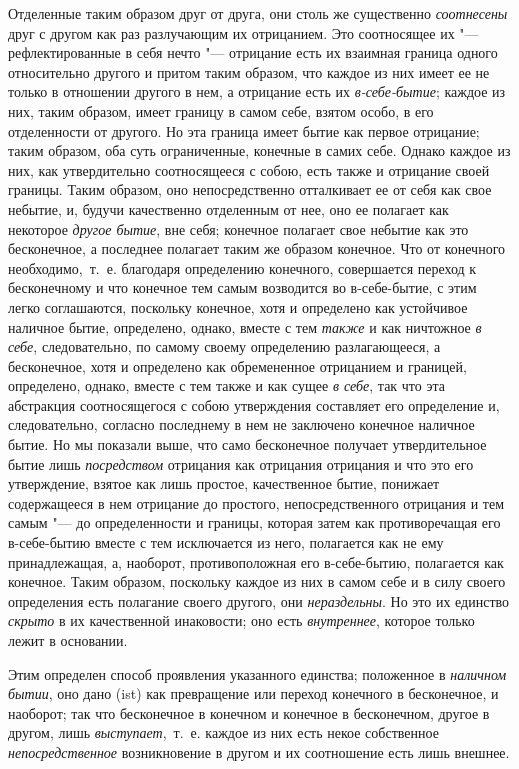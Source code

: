 Отделенные таким образом друг от друга, они столь же существенно
{\em соотнесены} друг с другом как раз разлучающим их
отрицанием. Это соотносящее их "--- рефлектированные в себя нечто "--- отрицание
есть их взаимная граница одного относительно другого и притом таким
образом, что каждое из них имеет ее не только в отношении другого в нем, а
отрицание есть их {\em в-себе-бытие}; каждое из них,
таким образом, имеет границу в самом себе, взятом особо, в его отделенности
от другого. Но эта граница имеет бытие как первое отрицание; таким образом,
оба суть ограниченные, конечные в самих себе. Однако каждое из них, как
утвердительно соотносящееся с собою, есть также и отрицание своей границы.
Таким образом, оно непосредственно отталкивает ее от себя как свое небытие,
и, будучи качественно отделенным от нее, оно ее полагает как некоторое
{\em другое бытие}, вне себя; конечное полагает свое
небытие как это бесконечное, а последнее полагает таким же образом
конечное. Что от конечного необходимо,~т.~е. благодаря определению
конечного, совершается переход к бесконечному и что конечное тем самым
возводится во в-себе-бытие, с этим легко соглашаются, поскольку конечное,
хотя и определено как устойчивое наличное бытие, определено, однако, вместе
с тем {\em также} и как ничтожное
{\em в себе}, следовательно, по самому своему
определению разлагающееся, а бесконечное, хотя и определено как
обремененное отрицанием и границей, определено, однако, вместе с тем также
и как сущее {\em в себе}, так что эта абстракция
соотносящегося с собою утверждения составляет его определение и,
следовательно, согласно последнему в нем не заключено конечное наличное
бытие. Но мы показали выше, что само бесконечное получает утвердительное
бытие лишь {\em посредством} отрицания как отрицания
отрицания и что это его утверждение, взятое как лишь простое, качественное
бытие, понижает содержащееся в нем отрицание до простого, непосредственного
отрицания и тем самым "--- до определенности и границы, которая затем как
противоречащая его в-себе-бытию вместе с тем исключается из него,
полагается как не ему принадлежащая, а, наоборот, противоположная его
в-себе-бытию, полагается как конечное. Таким образом, поскольку каждое из
них в самом себе и в силу своего определения есть полагание своего другого,
они {\em нераздельны}. Но это их единство
{\em скрыто} в их качественной инаковости; оно есть
{\em внутреннее}, которое только лежит в основании.

Этим определен способ проявления указанного единства; положенное в
{\em наличном бытии}, оно дано (ist) как превращение
или переход конечного в бесконечное, и наоборот; так что бесконечное в
конечном и конечное в бесконечном, другое в другом, лишь
{\em выступает},~т.~е. каждое из них есть некое
собственное {\em непосредственное} возникновение в
другом и их соотношение есть лишь внешнее.

